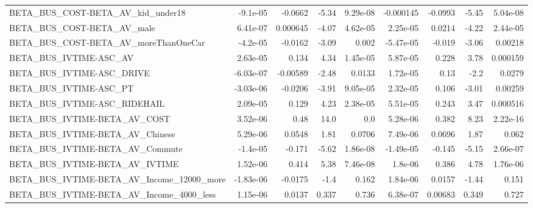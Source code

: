 \begin{tabular}{lrrrrrrrr}
BETA\_BUS\_COST-BETA\_AV\_kid\_under18                  &    -9.1e-05 &      -0.0662 &    -5.34 & 9.29e-08 &  -0.000145 &     -0.0993 &        -5.45 &      5.04e-08 \\
BETA\_BUS\_COST-BETA\_AV\_male                         &    6.41e-07 &     0.000645 &    -4.07 & 4.62e-05 &   2.25e-05 &      0.0214 &        -4.22 &      2.44e-05 \\
BETA\_BUS\_COST-BETA\_AV\_moreThanOneCar               &    -4.2e-05 &      -0.0162 &    -3.09 &    0.002 &  -5.47e-05 &      -0.019 &        -3.06 &       0.00218 \\
BETA\_BUS\_IVTIME-ASC\_AV                             &    2.63e-05 &        0.134 &     4.34 & 1.45e-05 &   5.87e-05 &       0.228 &         3.78 &      0.000159 \\
BETA\_BUS\_IVTIME-ASC\_DRIVE                          &   -6.03e-07 &     -0.00589 &    -2.48 &   0.0133 &   1.72e-05 &        0.13 &         -2.2 &        0.0279 \\
BETA\_BUS\_IVTIME-ASC\_PT                             &   -3.03e-06 &      -0.0206 &    -3.91 & 9.05e-05 &   2.32e-05 &       0.106 &        -3.01 &       0.00259 \\
BETA\_BUS\_IVTIME-ASC\_RIDEHAIL                       &    2.09e-05 &        0.129 &     4.23 & 2.38e-05 &   5.51e-05 &       0.243 &         3.47 &      0.000516 \\
BETA\_BUS\_IVTIME-BETA\_AV\_COST                       &    3.52e-06 &         0.48 &     14.0 &      0.0 &   5.28e-06 &       0.382 &         8.23 &      2.22e-16 \\
BETA\_BUS\_IVTIME-BETA\_AV\_Chinese                    &    5.29e-06 &       0.0548 &     1.81 &   0.0706 &   7.49e-06 &      0.0696 &         1.87 &         0.062 \\
BETA\_BUS\_IVTIME-BETA\_AV\_Commute                    &    -1.4e-05 &       -0.171 &    -5.62 & 1.86e-08 &  -1.49e-05 &      -0.145 &        -5.15 &      2.66e-07 \\
BETA\_BUS\_IVTIME-BETA\_AV\_IVTIME                     &    1.52e-06 &        0.414 &     5.38 & 7.46e-08 &    1.8e-06 &       0.386 &         4.78 &      1.76e-06 \\
BETA\_BUS\_IVTIME-BETA\_AV\_Income\_12000\_more          &   -1.83e-06 &      -0.0175 &     -1.4 &    0.162 &   1.84e-06 &      0.0157 &        -1.44 &         0.151 \\
BETA\_BUS\_IVTIME-BETA\_AV\_Income\_4000\_less           &    1.15e-06 &       0.0137 &    0.337 &    0.736 &   6.38e-07 &     0.00683 &        0.349 &         0.727 \\

\end{tabular}
